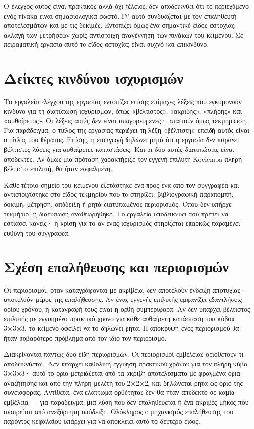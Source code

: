 Ο έλεγχος αυτός είναι πρακτικός αλλά όχι τέλειος: δεν αποδεικνύει ότι το περιεχόμενο ενός πίνακα είναι σημασιολογικά σωστό. Γι' αυτό συνδυάζεται με τον επαληθευτή αποτελεσμάτων και με τις δοκιμές. Εντοπίζει όμως ένα σημαντικό είδος αστοχίας: αλλαγή των μετρήσεων χωρίς αντίστοιχη αναγέννηση των πινάκων του κειμένου. Σε πειραματική εργασία αυτό το είδος αστοχίας είναι συχνό και επικίνδυνο.

\section{Δείκτες κινδύνου ισχυρισμών}
\label{sec:validation-markers}
Το εργαλείο ελέγχου της εργασίας εντοπίζει επίσης επίμαχες λέξεις που εγκυμονούν κίνδυνο για τη διατύπωση ισχυρισμών, όπως «βέλτιστος», «ακριβής», «πλήρης» και «αυθαίρετος». Οι λέξεις αυτές δεν είναι απαγορευμένες· απαιτούν όμως τεκμηρίωση. Για παράδειγμα, ο τίτλος της εργασίας περιέχει τη λέξη «βέλτιστη» επειδή αυτός είναι ο τίτλος του θέματος. Επίσης, η εισαγωγή δηλώνει ρητά ότι η εργασία δεν παράγει βέλτιστες λύσεις για αυθαίρετες καταστάσεις. Και οι δύο αυτές διατυπώσεις είναι αποδεκτές. Αν όμως μια πρόταση χαρακτήριζε τον εγγενή επιλυτή Kociemba πλήρη βέλτιστο επιλυτή, θα ήταν εσφαλμένη.

Κάθε τέτοιο σημείο του κειμένου εξετάστηκε ένα προς ένα από τον συγγραφέα και αντιστοιχίστηκε στο είδος τεκμηρίου που το στηρίζει: βιβλιογραφική παραπομπή, δοκιμή, μέτρηση, απόδειξη ή ρητά διατυπωμένος περιορισμός. Όπου δεν υπήρχε τεκμήριο, η διατύπωση αναθεωρήθηκε. Το εργαλείο υποδεικνύει πού πρέπει να εστιάσει κανείς· η κρίση για το αν ένας ισχυρισμός στηρίζεται επαρκώς παραμένει ευθύνη του συγγραφέα.

\section{Σχέση επαλήθευσης και περιορισμών}
\label{sec:validation-limitations}
Οι περιορισμοί, όταν καταγράφονται με ακρίβεια, δεν αποτελούν ένδειξη αποτυχίας· αποτελούν μέρος της επαλήθευσης. Αν ένας εγγενής επιλυτής εμφανίζει εξαντλήσεις ορίου χρόνου, η καταγραφή τους είναι η ορθή συμπεριφορά. Αν δεν υπάρχει βέλτιστος επιλυτής με εγγυημένο πρακτικό χρόνο για κάθε αυθαίρετη κατάσταση του κύβου 3×3×3, το κείμενο οφείλει να το δηλώνει ρητά. Η απόκρυψη ενός περιορισμού θα ήταν σοβαρότερο πρόβλημα από τον ίδιο τον περιορισμό.

Διακρίνονται πάντως δύο είδη περιορισμών. Οι περιορισμοί εμβέλειας οριοθετούν τι αποδεικνύεται. Δεν υπάρχει καθολική εγγύηση πρακτικού χρόνου για τον πλήρη κύβο 3×3×3· αυτό το όριο μετριάζεται από τα ακριβή αποτελέσματα με φραγμένα όρια αναζήτησης και από την πλήρη μελέτη του 2×2×2, και δηλώνεται ρητά ως όριο της συνεισφοράς. Αντίθετα, ένα ελάττωμα ορθότητας δεν θα ήταν αποδεκτό σε καμία εμβέλεια — για παράδειγμα, μια λύση που δεν επαληθεύεται ή ένα ακριβές μήκος που αναιρείται από ανεξάρτητη απόδειξη. Ολόκληρος ο μηχανισμός επαλήθευσης του παρόντος κεφαλαίου υπάρχει για να αποκλείει αυτό το δεύτερο είδος.


